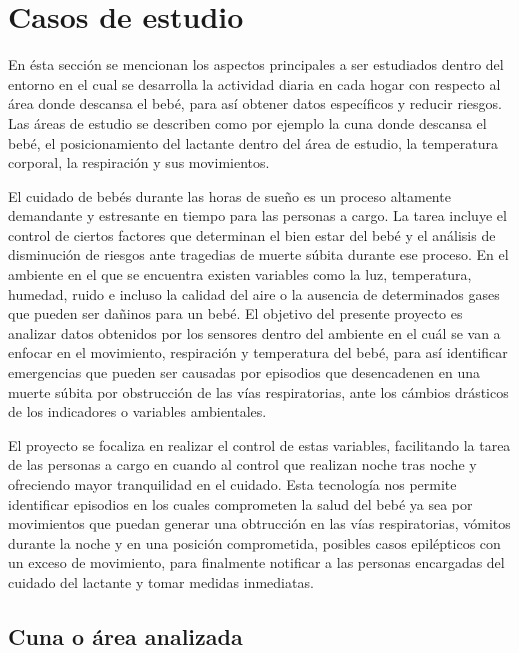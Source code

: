 \documentclass{IEEEtran}
\begin{document}
	\section{Casos de estudio}

		En ésta sección se mencionan los aspectos principales a ser estudiados dentro del entorno en el cual se desarrolla la actividad diaria en cada hogar con respecto al área donde descansa el bebé, para así obtener datos específicos y reducir riesgos. Las áreas de estudio se describen como por ejemplo la cuna donde descansa el bebé, el posicionamiento del lactante dentro del área de estudio, la temperatura corporal, la respiración y sus movimientos.

		El cuidado de bebés durante las horas de sueño es un proceso altamente demandante y estresante en tiempo para las personas a cargo. La tarea incluye el control de ciertos factores que determinan el bien estar del bebé y el análisis de disminución de riesgos ante tragedias de muerte súbita durante ese proceso. En el ambiente en el que se encuentra existen variables como la luz, temperatura, humedad, ruido e incluso la calidad del aire o la ausencia de determinados gases que pueden ser dañinos para un bebé. El objetivo del presente proyecto es analizar datos obtenidos por los sensores dentro del ambiente en el cuál se van a enfocar en el movimiento, respiración y temperatura del bebé, para así identificar emergencias que pueden ser causadas por episodios que desencadenen en una muerte súbita por obstrucción de las vías respiratorias, ante los cámbios drásticos de los indicadores o variables ambientales.
		
		El proyecto se focaliza en realizar el control de estas variables, facilitando la tarea de las personas a cargo en cuando al control que realizan noche tras noche y ofreciendo mayor tranquilidad en el cuidado. Esta tecnología nos permite identificar episodios en los cuales comprometen la salud del bebé ya sea por movimientos que puedan generar una obtrucción en las vías respiratorias, vómitos durante la noche y en una posición comprometida, posibles casos epilépticos con un exceso de movimiento, para finalmente notificar a las personas encargadas del cuidado del lactante y tomar medidas inmediatas.

		\subsection{Cuna o área analizada}
\end{document}
